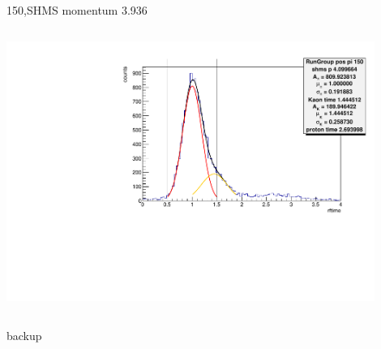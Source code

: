 \documentclass[aspectratio=169,xcolor=dvipsnames]{beamer}
\begin{document}
\begin{frame}{150,SHMS momentum 3.936}
\begin{columns}
\begin{column}[T]{0.3\textwidth}
\includegraphics[width = 0.9\textwidth]{results/pid/rftime/rftime_pos_150_5_pi.pdf}
\end{column}
\end{columns}
\end{frame}

\begin{frame}
  backup
\end{frame}
\end{document}
